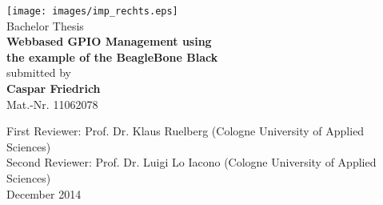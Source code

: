 \begin{otherlanguage}{english}

\begin{titlepage}
\begin{center}

\texttt{[image: images/imp\_rechts.eps]}\\[3cm]

Bachelor Thesis\\[0.5cm]
{\sffamily \bfseries \Huge Webbased GPIO Management using\\[0.25cm]
the example of the BeagleBone Black}\\[2cm]

submitted by\\[0.5cm]
\textbf{Caspar Friedrich}\\[0.5cm]
Mat.-Nr. 11062078\\[0.5cm]

\vfill

First Reviewer: Prof. Dr. Klaus Ruelberg (Cologne University of Applied Sciences)\\[0.5cm]
Second Reviewer: Prof. Dr. Luigi Lo Iacono (Cologne University of Applied Sciences)\\[0.5cm]
December 2014

\end{center}
\end{titlepage}

\end{otherlanguage}
